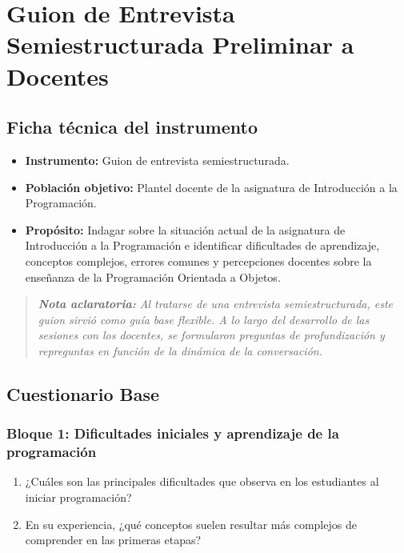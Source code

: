 \chapter{\Large Guion de Entrevista Semiestructurada Preliminar a Docentes}
\label{anexo:entrevista_docentes}

\vspace{-1.5em}
\section*{Ficha técnica del instrumento}
\begin{itemize}
    \item \textbf{Instrumento:} 
        Guion de entrevista semiestructurada.
    \item \textbf{Población objetivo:}
         Plantel docente de la asignatura de Introducción a la Programación.
    \item \textbf{Propósito:} 
        Indagar sobre la situación actual de la asignatura de Introducción a la 
        Programación e identificar dificultades de aprendizaje, conceptos 
        complejos, errores comunes y percepciones docentes sobre la enseñanza 
        de la Programación Orientada a Objetos.
\end{itemize}

\blockquote{\textit{\textbf{Nota aclaratoria:} 
    Al tratarse de una entrevista semiestructurada, este guion sirvió como 
    guía base flexible. A lo largo del desarrollo de las sesiones con los 
    docentes, se formularon preguntas de profundización y repreguntas en 
    función de la dinámica de la conversación.}}

\vspace{-1em}
\section*{Cuestionario Base}

\subsection*{Bloque 1: Dificultades iniciales y aprendizaje de la programación}
\begin{enumerate}
    \item 
        ¿Cuáles son las principales dificultades que observa en los estudiantes 
        al iniciar programación?
    \item 
        En su experiencia, ¿qué conceptos suelen resultar más complejos de 
        comprender en las primeras etapas?
\end{enumerate}

